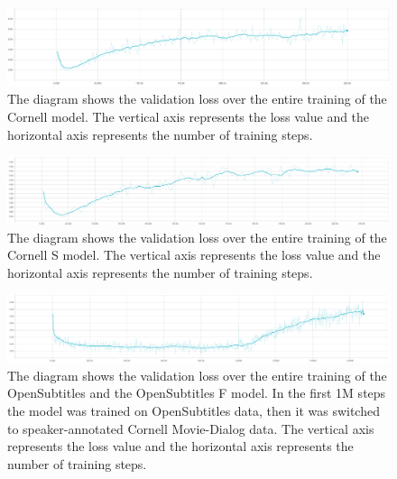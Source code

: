\documentclass[12pt]{article}
\begin{document}
\begin{figure}[H] 
	\centering
	\includegraphics[width=1.0\textwidth]{pics/cornell_loss.png}
	\caption{The diagram shows the validation loss over the entire training of the Cornell model. The vertical axis represents the loss value and the horizontal axis represents the number of training steps.}
	\label{CornellOverfit}
\end{figure}
\begin{figure}[H] 
	\centering
	\includegraphics[width=1.0\textwidth]{pics/cornell_speakers_loss.png}
	\caption{The diagram shows the validation loss over the entire training of the Cornell S model. The vertical axis represents the loss value and the horizontal axis represents the number of training steps.}
	\label{CornellSOverfit}
\end{figure}

\begin{figure}[H] 
	\centering
	\includegraphics[width=1.0\textwidth]{pics/finetuned_loss.png}
	\caption{The diagram shows the validation loss over the entire training of the OpenSubtitles and the OpenSubtitles F model. In the first 1M steps the model was trained on OpenSubtitles data, then it was switched to speaker-annotated Cornell Movie-Dialog data. The vertical axis represents the loss value and the horizontal axis represents the number of training steps.}
	\label{Finetuned_loss}
\end{figure}
\end{document}
